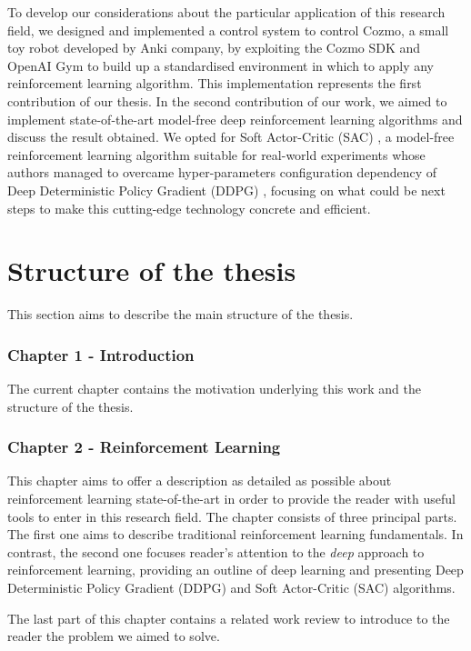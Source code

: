To develop our considerations about the particular application of this research field, we designed and implemented a control system to control Cozmo, a small toy robot developed by Anki company, by exploiting the Cozmo SDK and OpenAI Gym to build up a standardised environment in which to apply any reinforcement learning algorithm.
This implementation represents the first contribution of our thesis.
In the second contribution of our work, we aimed to implement state-of-the-art model-free deep reinforcement learning algorithms and discuss the result obtained.
We opted for Soft Actor-Critic (SAC) \cite{haarnoja2018alg,haarnoja2018soft}, a model-free reinforcement learning algorithm suitable for real-world experiments whose authors managed to overcame hyper-parameters configuration dependency of Deep Deterministic Policy Gradient (DDPG) \cite{lillicrap2015continuous}, focusing on what could be next steps to make this cutting-edge technology concrete and efficient.

\section{Structure of the thesis}

This section aims to describe the main structure of the thesis.

\subsubsection*{Chapter 1 - Introduction}

The current chapter contains the motivation underlying this work and the structure of the thesis.

\subsubsection*{Chapter 2 - Reinforcement Learning}

This chapter aims to offer a description as detailed as possible about reinforcement learning state-of-the-art in order to provide the reader with useful tools to enter in this research field.
The chapter consists of three principal parts.
The first one aims to describe traditional reinforcement learning fundamentals.
In contrast, the second one focuses reader's attention to the \textit{deep} approach to reinforcement learning, providing an outline of deep learning and presenting Deep Deterministic Policy Gradient (DDPG) and Soft Actor-Critic (SAC) algorithms.

The last part of this chapter contains a related work review to introduce to the reader the problem we aimed to solve.

